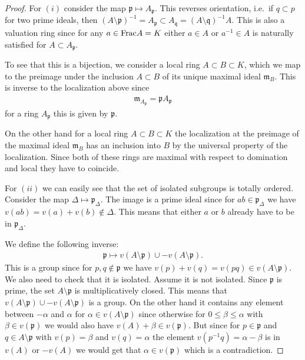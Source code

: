 \begin{proof}
  For $(i)$ consider the map $\mathfrak{p} \mapsto
  A_\mathfrak{p}$. This reverses orientation, i.e.\ if
  $q\subset p$ for two prime ideals, then $(A\setminus
  \mathfrak{p} )^{-1} = A_\mathfrak{p} \subset
  A_\mathfrak{q} = (A\setminus
  \mathfrak{q})^{-1}A$. This is also a valuation ring since for any
  $a\in \mathrm{Frac} A = K$ either $a\in A$ or $a^{-1}\in A$
  is naturally satisfied for $A\subset A_\mathfrak{p}$.

  To see that this is a bijection, we consider a local ring
  $A\subset B \subset K$, which we map to the preimage under the
  inclusion $A \subset B$ of its unique maximal ideal
  $\mathfrak{m}_B$. This is inverse to the localization above since
  \begin{align*}
    \mathfrak{m}_{A_\mathfrak{p}} = \mathfrak{p} A_\mathfrak{p}
  \end{align*}
  for a ring $A_\mathfrak{p}$ this is given by $\mathfrak{p}$.

  On the other hand for a local ring $A \subset B \subset K$ the
  localization at the preimage of the maximal ideal $\mathfrak{m}_B$
  has an inclusion into $B$ by the universal property of the
  localization. Since both of these rings are maximal with respect to
  domination and local they have to coincide.

  \vspace{\baselineskip}

  For $(ii)$ we can easily see that the set of isolated subgroups is
  totally ordered.
  Consider the map $\Delta \mapsto \mathfrak{p}_\Delta$. The image is
  a prime ideal since for $ab\in \mathfrak{p}_\Delta$ we have $v(ab) =
  v(a) + v(b) \notin \Delta$. This means that either $a$ or $b$
  already have to be in $\mathfrak{p}_\Delta$.

  We define the following inverse:
  \begin{align*}
    \mathfrak{p} \mapsto v(A \setminus \mathfrak{p})\cup -v(A \setminus \mathfrak{p}).
  \end{align*}
  This is a group since for $p,q\notin \mathfrak{p}$ we have $v(p)+
  v(q) = v(pq)\in v(A \setminus \mathfrak{p})$. We also need to check that it is isolated.
  Assume it is not isolated. Since $\mathfrak{p}$ is prime, the set
  $A\setminus \mathfrak{p}$ is multiplicatively closed. This means
  that $v(A \setminus \mathfrak{p})\cup -v(A \setminus \mathfrak{p})$
  is a group. On the other hand it contains any element between
  $-\alpha $ and $\alpha$ for $\alpha \in v(A \setminus \mathfrak{p})$
  since otherwise for $0\leq \beta \leq \alpha$ with $\beta \in
  v(\mathfrak{p})$ we would also have $v(A) + \beta \in
  v(\mathfrak{p})$. But since for $p \in \mathfrak{p}$ and $q\in A
  \setminus \mathfrak{p}$ with $v(p) = \beta $ and $v(q) = \alpha$ the
  element $v(p^{-1}q) = \alpha -\beta$ is in $v(A)$ or $-v(A)$ we
  would get that $\alpha \in v(\mathfrak{p})$ which is a contradiction. 
  

\end{proof}
